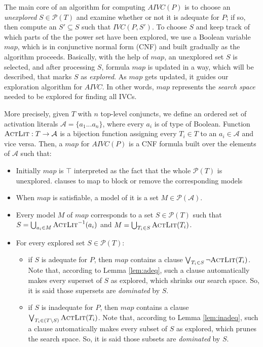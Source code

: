 The main core of an algorithm for computing $AIVC(P)$ is to choose an \emph{unexplored} $S \in \mathcal{P}(T)$ and examine whether or not it is adequate for $P$; if so, then compute an $S' \subseteq S$ such that $IVC(P, S')$.
To choose $S$ and keep track of which parts of the the power set
have been explored, we use a Boolean variable $map$, which is
in conjunctive normal form (CNF) and built gradually as the algorithm proceeds. 
Basically, with the help of $map$, an unexplored set $S$ is selected, and after processing $S$,
formula $map$ is updated in a way, which will be described, that marks $S$ as \emph{explored}.
As $map$ gets updated, it guides our exploration algorithm for $AIVC$.
In other words, $map$ represents the \emph{search space} needed to be explored for finding all IVCs.

More precisely, given $T$ with $n$ top-level conjuncts,
we define an ordered
set of activation literals $\mathcal{A} = \{a_1...a_n\}$, where every $a_i$ is of type of Boolean. Function $\textsc{ActLit} : T \rightarrow \mathcal{A}$
is a bijection function assigning every $T_i \in T$ to an $a_i \in \mathcal{A}$ and vice versa.
Then, a $map$ for $AIVC(P)$ is a CNF formula built over the elements of $\mathcal{A}$ such that:
\begin{itemize}
  \item Initially $map$ is $\top$ interpreted as the fact that the whole $\mathcal{P}(T)$ is unexplored.   
clauses to map to block or remove the corresponding models
  \item When $map$ is satisfiable, a model of it is a set
  $M \in \mathcal{P}(\mathcal{A})$.
  \item Every model $M$ of $map$ corresponds to a set $S \in \mathcal{P}(T)$ such that
$S = \bigcup_{a_i \in M} \textsc{ActLit} ^{-1} (a_i)$ and $M = \bigcup_{T_i \in S} \textsc{ActLit}(T_i)$.
  \item For every explored set $S \in \mathcal{P}(T)$:
  \begin{itemize}
    \item if $S$ is adequate for $P$, then $map$ contains a clause $\bigvee_{T_{i}\in S} \neg {\textsc{ActLit}(T_i)}$. Note that, according to Lemma \ref{lem:adeq}, such a clause automatically makes every superset of $S$ as explored, which shrinks our search space. So, it is said those supersets are \emph{dominated} by $S$.
    \item if $S$ is inadequate for $P$, then $map$ contains a clause $\bigvee_{T_{i}\in (T \setminus S)} \textsc{ActLit} (T_i)$. Note that, according to Lemma \ref{lem:inadeq}, such a clause automatically makes every subset of $S$ as explored, which prunes the search space. So, it is said those subsets are \emph{dominated} by $S$.
  \end{itemize}
\end{itemize}


